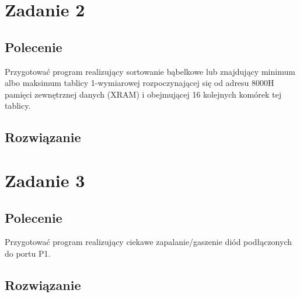 \documentclass[a4paper,12pt]{extarticle}  %
\begin{document}
\section{Zadanie 2}
\subsection{Polecenie}
Przygotować program realizujący sortowanie bąbelkowe lub znajdujący minimum albo maksimum
tablicy 1-wymiarowej rozpoczynającej się od adresu 8000H pamięci zewnętrznej danych (XRAM)
i obejmującej 16 kolejnych komórek tej tablicy.
\subsection{Rozwiązanie}

\section{Zadanie 3}
\subsection{Polecenie}
Przygotować program realizujący ciekawe zapalanie/gaszenie diód podłączonych do portu P1.
\subsection{Rozwiązanie}
\end{document}
